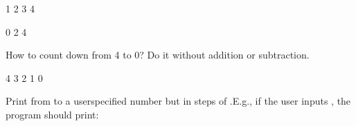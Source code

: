 \documentclass[letterpaper,10pt,english]{sphinxmanual}
\begin{document}
\begin{sphinxVerbatim}[commandchars=\\\{\}]
1
2
3
4
\end{sphinxVerbatim}


\begin{sphinxVerbatim}[commandchars=\\\{\}]
      
\end{sphinxVerbatim}

\begin{sphinxVerbatim}[commandchars=\\\{\}]
0
2
4
\end{sphinxVerbatim}

 How to count down from 4 to 0? Do it without addition or subtraction.

\begin{sphinxVerbatim}[commandchars=\\\{\}]
    
\end{sphinxVerbatim}

\begin{sphinxVerbatim}[commandchars=\\\{\}]
4
3
2
1
0
\end{sphinxVerbatim}

 Print from  to a user\sphinxhyphen{}specified number but in steps of .E.g., if the user inputs , the program should print:

\begin{sphinxVerbatim}[commandchars=\\\{\}]
\end{sphinxVerbatim}
\end{document}

